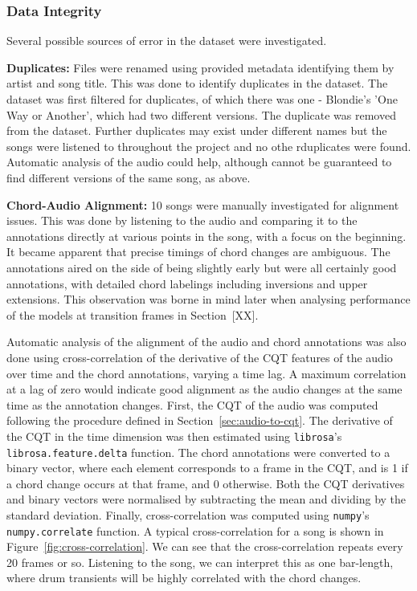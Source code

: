 \subsubsection{Data Integrity}

Several possible sources of error in the dataset were investigated.

\textbf{Duplicates:} Files were renamed using provided metadata identifying them by artist and song title. This was done to identify duplicates in the dataset. The dataset was first filtered for duplicates, of which there was one - Blondie's 'One Way or Another', which had two different versions. The duplicate was removed from the dataset. Further duplicates may exist under different names but the songs were listened to throughout the project and no othe rduplicates were found. Automatic analysis of the audio could help, although cannot be guaranteed to find different versions of the same song, as above.

\textbf{Chord-Audio Alignment:} 10 songs were manually investigated for alignment issues. This was done by listening to the audio and comparing it to the annotations directly at various points in the song, with a focus on the beginning. It became apparent that precise timings of chord changes are ambiguous. The annotations aired on the side of being slightly early but were all certainly good annotations, with detailed chord labelings including inversions and upper extensions. This observation was borne in mind later when analysing performance of the models at transition frames in Section~[XX].

Automatic analysis of the alignment of the audio and chord annotations was also done using cross-correlation of the derivative of the CQT features of the audio over time and the chord annotations, varying a time lag. A maximum correlation at a lag of zero would indicate good alignment as the audio changes at the same time as the annotation changes. First, the CQT of the audio was computed following the procedure defined in Section~\ref{sec:audio-to-cqt}. The derivative of the CQT in the time dimension was then estimated using \texttt{librosa}'s \texttt{librosa.feature.delta} function. The chord annotations were converted to a binary vector, where each element corresponds to a frame in the CQT, and is 1 if a chord change occurs at that frame, and 0 otherwise. Both the CQT derivatives and binary vectors were normalised by subtracting the mean and dividing by the standard deviation. Finally, cross-correlation was computed using \texttt{numpy}'s \texttt{numpy.correlate} function. A typical cross-correlation for a song is shown in Figure~\ref{fig:cross-correlation}. We can see that the cross-correlation repeats every 20 frames or so. Listening to the song, we can interpret this as one bar-length, where drum transients will be highly correlated with the chord changes. 

